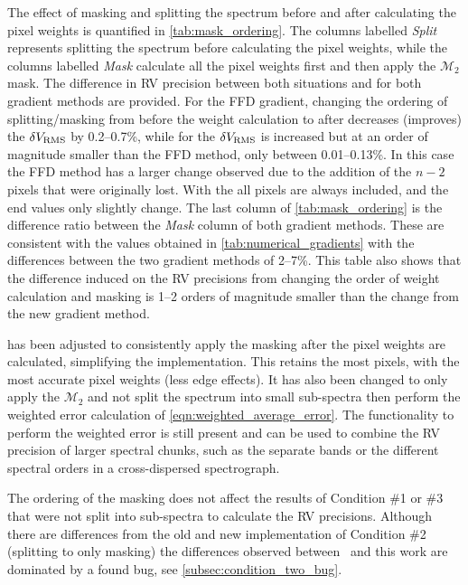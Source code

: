 The effect of masking and splitting the spectrum before and after calculating the pixel weights is quantified in \cref{tab:mask_ordering}.
The columns labelled \emph{Split} represents splitting the spectrum before calculating the pixel weights, while the columns labelled \emph{Mask} calculate all the pixel weights first and then apply the \({\mathcal{M}}_{2}\) mask.
The difference in {RV} precision between both situations and for both gradient methods are provided.
For the {FFD} gradient, changing the ordering of splitting/masking from before the weight calculation to after decreases (improves) the {\(\delta V_{\textrm{RMS}}\)} by 0.2--0.7\%, while for \npgradient{} the \(\delta V_{\textrm{RMS}}\) is increased but at an order of magnitude smaller than the {FFD} method, only between 0.01--0.13\%.
In this case the {FFD} method has a larger change observed due to the addition of the \(n-2\) pixels that were originally lost.
With the \npgradient{} all pixels are always included, and the end values only slightly change.
The last column of \cref{tab:mask_ordering} is the difference ratio between the \emph{Mask} column of both gradient methods.
These are consistent with the values obtained in \cref{tab:numerical_gradients} with the differences between the two gradient methods of 2--7\%.
This table also shows that the difference induced on the {RV} precisions from changing the order of weight calculation and masking is 1--2 orders of magnitude smaller than the change from the new gradient method.

\Eniric{} has been adjusted to consistently apply the masking after the pixel weights are calculated, simplifying the implementation.
This retains the most pixels, with the most accurate pixel weights (less edge effects).
It has also been changed to only apply the \({\mathcal{M}}_{2}\) and not split the spectrum into small sub-spectra then perform the weighted error calculation of \cref{eqn:weighted_average_error}.
The functionality to perform the weighted error is still present and can be used to combine the {RV} precision of larger spectral chunks, such as the separate \nir{} bands or the different spectral orders in a cross-dispersed spectrograph.



The ordering of the masking does not affect the results of Condition \#1 or \#3 that were not split into sub-spectra to calculate the {RV} precisions.
Although there are differences from the old and new implementation of Condition \#2 (splitting to only masking) the differences observed between~\citet{figueira_radial_2016} and this work are dominated by a found bug, see \cref{subsec:condition_two_bug}.


